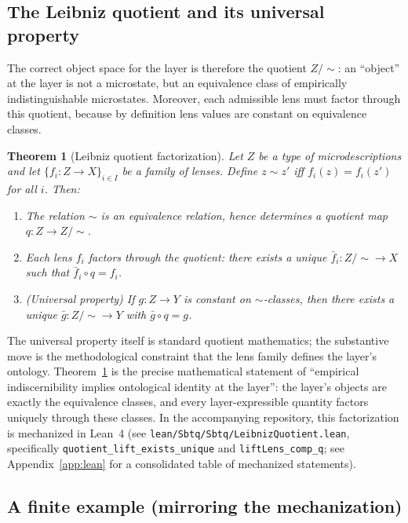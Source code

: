 \documentclass[11pt]{article}
\newtheorem{theorem}{Theorem}
\begin{document}
\subsection{The Leibniz quotient and its universal property}

The correct object space for the layer is therefore the quotient $Z/{\sim}$: an ``object'' at the layer is not a microstate, but an equivalence class of empirically indistinguishable microstates.
Moreover, each admissible lens must factor through this quotient, because by definition lens values are constant on equivalence classes.

\begin{theorem}[Leibniz quotient factorization]\label{thm:leibniz-quotient}
Let $Z$ be a type of microdescriptions and let $\{f_i : Z\to X\}_{i\in I}$ be a family of lenses. Define $z\sim z'$ iff $f_i(z)=f_i(z')$ for all $i$.
Then:
\begin{enumerate}
  \item The relation $\sim$ is an equivalence relation, hence determines a quotient map $q: Z\to Z/{\sim}$.
  \item Each lens $f_i$ factors through the quotient: there exists a unique $\bar f_i : Z/{\sim}\to X$ such that $\bar f_i\circ q = f_i$.
  \item (Universal property) If $g:Z\to Y$ is constant on $\sim$-classes, then there exists a unique $\bar g: Z/{\sim}\to Y$ with $\bar g\circ q = g$.
\end{enumerate}
\end{theorem}

The universal property itself is standard quotient mathematics; the substantive move is the methodological constraint that the lens family defines the layer's ontology. Theorem~\ref{thm:leibniz-quotient} is the precise mathematical statement of ``empirical indiscernibility implies ontological identity at the layer'': the layer's objects are exactly the equivalence classes, and every layer-expressible quantity factors uniquely through these classes. In the accompanying repository, this factorization is mechanized in Lean~4 (see \texttt{lean/Sbtq/Sbtq/LeibnizQuotient.lean}, specifically \texttt{quotient\_lift\_exists\_unique} and \texttt{liftLens\_comp\_q}; see Appendix~\ref{app:lean} for a consolidated table of mechanized statements).

\subsection{A finite example (mirroring the mechanization)}
\end{document}
